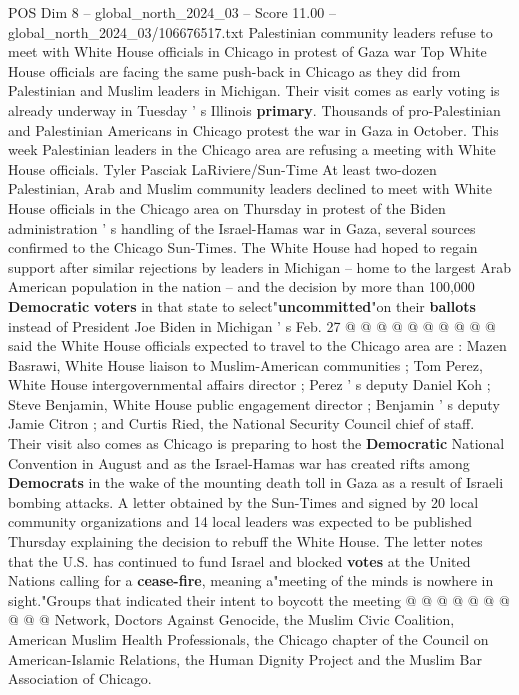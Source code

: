 \begin{textsample}{POS Dim 8 – global\_north\_2024\_03 – Score 11.00 – global\_north\_2024\_03/106676517.txt}  \label{ex:f8_pos_013}
Palestinian community leaders refuse to meet with White House officials in Chicago in protest of Gaza war Top White House officials are facing the same push-back in Chicago as they did from Palestinian and Muslim leaders in Michigan.
Their visit comes as early voting is already underway in Tuesday ' s Illinois \textbf{primary}.
Thousands of pro-Palestinian and Palestinian Americans in Chicago protest the war in Gaza in October.
This week Palestinian leaders in the Chicago area are refusing a meeting with White House officials.
Tyler Pasciak LaRiviere/Sun-Time At least two-dozen Palestinian, Arab and Muslim community leaders declined to meet with White House officials in the Chicago area on Thursday in protest of the Biden administration ' s handling of the Israel-Hamas war in Gaza, several sources confirmed to the Chicago Sun-Times.
The White House had hoped to regain support after similar rejections by leaders in Michigan -- home to the largest Arab American population in the nation -- and the decision by more than 100,000 \textbf{Democratic} \textbf{voters} in that state to select"\textbf{uncommitted}"on their \textbf{ballots} instead of President Joe Biden in Michigan ' s Feb. 27 @ @ @ @ @ @ @ @ @ @ said the White House officials expected to travel to the Chicago area are : Mazen Basrawi, White House liaison to Muslim-American communities ; Tom Perez, White House intergovernmental affairs director ; Perez ' s deputy Daniel Koh ; Steve Benjamin, White House public engagement director ; Benjamin ' s deputy Jamie Citron ; and Curtis Ried, the National Security Council chief of staff.
Their visit also comes as Chicago is preparing to host the \textbf{Democratic} National Convention in August and as the Israel-Hamas war has created rifts among \textbf{Democrats} in the wake of the mounting death toll in Gaza as a result of Israeli bombing attacks.
A letter obtained by the Sun-Times and signed by 20 local community organizations and 14 local leaders was expected to be published Thursday explaining the decision to rebuff the White House.
The letter notes that the U.S. has continued to fund Israel and blocked \textbf{votes} at the United Nations calling for a \textbf{cease-fire}, meaning a"meeting of the minds is nowhere in sight."Groups that indicated their intent to boycott the meeting @ @ @ @ @ @ @ @ @ @ Network, Doctors Against Genocide, the Muslim Civic Coalition, American Muslim Health Professionals, the Chicago chapter of the Council on American-Islamic Relations, the Human Dignity Project and the Muslim Bar Association of Chicago.

\end{textsample}
